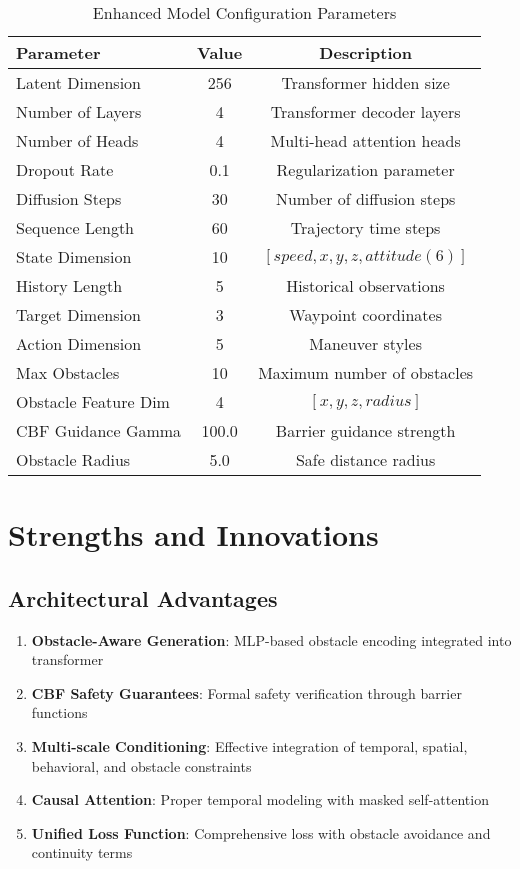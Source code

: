 \documentclass[12pt]{article}
\begin{document}
\begin{table}[h]
\centering
\caption{Enhanced Model Configuration Parameters}
\begin{tabular}{lcc}
\toprule
\textbf{Parameter} & \textbf{Value} & \textbf{Description} \\
\midrule
Latent Dimension & 256 & Transformer hidden size \\
Number of Layers & 4 & Transformer decoder layers \\
Number of Heads & 4 & Multi-head attention heads \\
Dropout Rate & 0.1 & Regularization parameter \\
Diffusion Steps & 30 & Number of diffusion steps \\
Sequence Length & 60 & Trajectory time steps \\
State Dimension & 10 & $[speed, x, y, z, attitude(6)]$ \\
History Length & 5 & Historical observations \\
Target Dimension & 3 & Waypoint coordinates \\
Action Dimension & 5 & Maneuver styles \\
Max Obstacles & 10 & Maximum number of obstacles \\
Obstacle Feature Dim & 4 & $[x, y, z, radius]$ \\
CBF Guidance Gamma & 100.0 & Barrier guidance strength \\
Obstacle Radius & 5.0 & Safe distance radius \\
\bottomrule
\end{tabular}
\end{table}

\section{Strengths and Innovations}

\subsection{Architectural Advantages}

\begin{enumerate}
    \item \textbf{Obstacle-Aware Generation}: MLP-based obstacle encoding integrated into transformer
    \item \textbf{CBF Safety Guarantees}: Formal safety verification through barrier functions
    \item \textbf{Multi-scale Conditioning}: Effective integration of temporal, spatial, behavioral, and obstacle constraints
    \item \textbf{Causal Attention}: Proper temporal modeling with masked self-attention
    \item \textbf{Unified Loss Function}: Comprehensive loss with obstacle avoidance and continuity terms
\end{enumerate}
\end{document}
